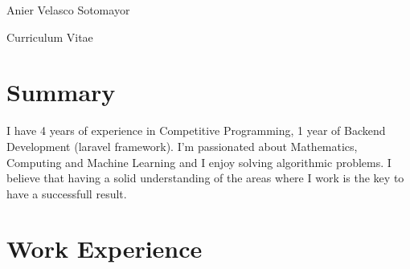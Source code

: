 \documentclass[
	10pt, %
]{FreemanCV}
\begin{document}
\begin{paracol}{2} %


\parbox[][0.11\textheight][c]{\linewidth}{ %
	\centering %
	
	{\sffamily\Huge Anier Velasco Sotomayor} %
	
	\medskip %
	
	{\Huge\textcolor{headings}{Curriculum Vitae}}
	
	\vfill %
}

\section*{Summary}

I have 4 years of experience in Competitive Programming, 1 year of Backend Development (laravel framework).
I'm passionated about Mathematics, Computing and Machine Learning and I enjoy solving algorithmic problems.
I believe that having a solid understanding of the areas where I work is the key to have a successfull result.



\section{Work Experience}




\end{paracol}
\end{document}
